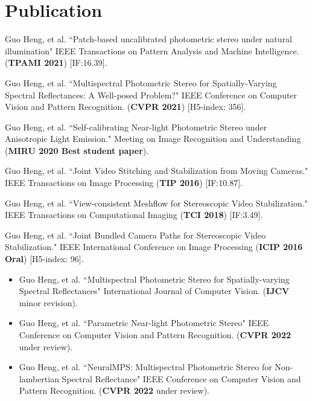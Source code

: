 \documentclass[UTF8]{ctexart}
\begin{document}
\section{Publication}
\begin{enumerate}[label={[\arabic*]}]
	\item Guo Heng, et al. ``Patch-based uncalibrated photometric stereo under natural illumination" 
	IEEE Transactions on Pattern Analysis and Machine Intelligence. (\textbf{TPAMI 2021}) [IF:16.39]. 
	\item Guo Heng, et al. ``Multispectral Photometric Stereo for Spatially-Varying Spectral Reflectances: A Well-posed Problem?" IEEE Conference on Computer Vision and Pattern Recognition. (\textbf{CVPR 2021}) [H5-index: 356]. 
	\item Guo Heng, et al. ``Self-calibrating Near-light Photometric Stereo under Anisotropic Light Emission." Meeting on Image Recognition and Understanding (\textbf{MIRU 2020 Best student paper}).  
	\item Guo Heng, et al. ``Joint Video Stitching and Stabilization from Moving Cameras." IEEE Transactions on Image Processing (\textbf{TIP 2016}) [IF:10.87].
	\item Guo Heng, et al. ``View-consistent Meshflow for Stereoscopic Video Stabilization." IEEE Transactions on Computational Imaging (\textbf{TCI 2018}) [IF:3.49].
	\item Guo Heng, et al. ``Joint Bundled Camera Paths for Stereoscopic Video Stabilization." IEEE International Conference on Image Processing (\textbf{ICIP 2016 Oral}) [H5-index: 96].
\end{enumerate}
\begin{itemize}[label={[*]}]
	\item Guo Heng, et al. ``Multispectral Photometric Stereo for Spatially-varying Spectral Reflectances" International Journal of Computer Vision. (\textbf{IJCV} minor revision).
	\item Guo Heng, et al. ``Parametric Near-light Photometric Stereo" IEEE Conference on Computer Vision and Pattern Recognition. (\textbf{CVPR 2022} under review). 
	\item Guo Heng, et al. ``NeuralMPS: Multispectral Photometric Stereo for Non-lambertian Spectral Reflectance" IEEE Conference on Computer Vision and Pattern Recognition. (\textbf{CVPR 2022} under review). 
\end{itemize}
%


\end{document}
